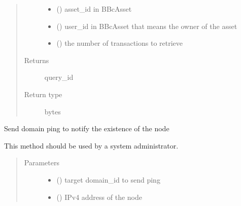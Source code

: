 \documentclass[letterpaper,10pt,english]{sphinxmanual}
\begin{document}
\begin{fulllineitems}
\begin{fulllineitems}
\begin{quote}
\begin{description}
\begin{itemize}
\item {} 
 () \textendash{} asset\_id in BBcAsset

\item {} 
 () \textendash{} user\_id in BBcAsset that means the owner of the asset

\item {} 
 () \textendash{} the number of transactions to retrieve

\end{itemize}

\item[{Returns}] \leavevmode
query\_id

\item[{Return type}] \leavevmode
bytes

\end{description}\end{quote}

\end{fulllineitems}


\begin{fulllineitems}
\label{\detokenize{bbc1.core.bbc_app:bbc1.core.bbc_app.BBcAppClient.send_domain_ping}}
Send domain ping to notify the existence of the node

This method should be used by a system administrator.
\begin{quote}\begin{description}
\item[{Parameters}] \leavevmode\begin{itemize}
\item {} 
 () \textendash{} target domain\_id to send ping

\item {} 
 () \textendash{} IPv4 address of the node


\end{itemize}
\end{description}
\end{quote}
\end{fulllineitems}
\end{fulllineitems}
\end{document}
